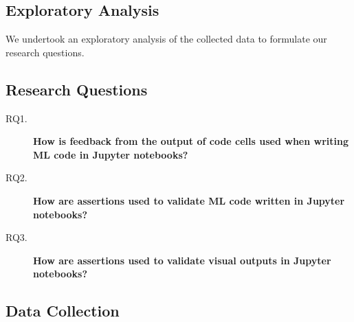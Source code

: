 \subsection{Exploratory Analysis}

We undertook an exploratory analysis of the collected data to formulate our research questions.

\subsection{Research Questions}

\begin{description}
  \item[RQ1.] \textbf{How is feedback from the output of code cells used when writing ML code in Jupyter notebooks?}
  \item[RQ2.] \textbf{How are assertions used to validate ML code written in Jupyter notebooks?}
  \item[RQ3.] \textbf{How are assertions used to validate visual outputs in Jupyter notebooks?}
\end{description}

\subsection{Data Collection}\label{sec:data-collect}



